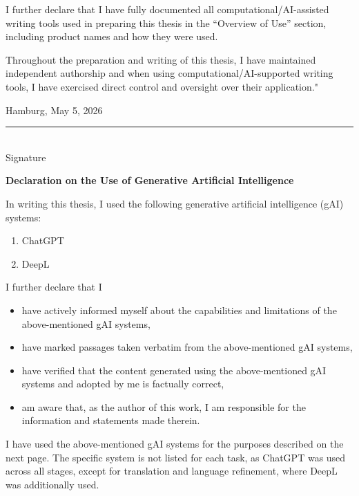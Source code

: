 \documentclass[
  letterpaper,
  11pt,
  english,
  singlespacing,
  headsepline,
  openany]{MastersDoctoralThesis}
\begin{document}
I further declare that I have fully documented all computational/AI-assisted writing tools used 
in preparing this thesis in the “Overview of Use” section, including product names and how 
they were used.

Throughout the preparation and writing of this thesis, I have maintained independent 
authorship and when using computational/AI-supported writing tools, I have exercised direct 
control and oversight over their application."
\vspace{3cm}

\noindent
\begin{minipage}[t]{0.45\textwidth}
\raggedright
Hamburg, May 5, 2026
\end{minipage}
\hfill
\begin{minipage}[t]{0.45\textwidth}
\raggedleft
\rule{5cm}{0.4pt}\\
Signature
\end{minipage}

\newpage
\thispagestyle{empty}

{\Large\bfseries Declaration on the Use of Generative Artificial Intelligence\par}
\vspace{1cm}

In writing this thesis, I used the following generative artificial intelligence (gAI) systems:

\begin{enumerate}
    \item ChatGPT
    \item DeepL
\end{enumerate}

I further declare that I

\begin{itemize}
    \item have actively informed myself about the capabilities and limitations of the above-mentioned gAI systems,
    \item have marked passages taken verbatim from the above-mentioned gAI systems,
    \item have verified that the content generated using the above-mentioned gAI systems and adopted by me is factually correct,
    \item am aware that, as the author of this work, I am responsible for the information and statements made therein.
\end{itemize}

I have used the above-mentioned gAI systems for the purposes described on the next page. The specific system is not listed for each task, as ChatGPT was used across all stages, except for translation and language refinement, where DeepL was additionally used.
\end{document}
